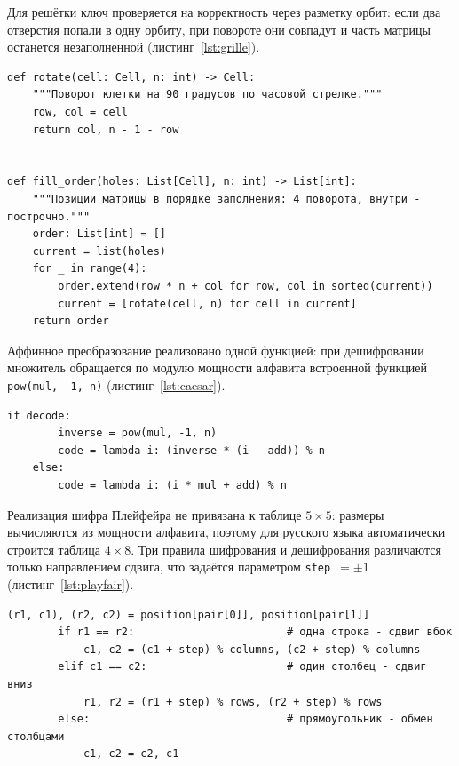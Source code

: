 \documentclass[14pt,a4paper]{extarticle}
\begin{document}
Для решётки ключ проверяется на корректность через разметку орбит: если два отверстия
попали в одну орбиту, при повороте они совпадут и часть матрицы останется незаполненной
(листинг~\ref{lst:grille}).

\begin{lstlisting}[style=python, caption={Разметка орбит поворота и порядок заполнения}, label={lst:grille}]
def rotate(cell: Cell, n: int) -> Cell:
    """Поворот клетки на 90 градусов по часовой стрелке."""
    row, col = cell
    return col, n - 1 - row


def fill_order(holes: List[Cell], n: int) -> List[int]:
    """Позиции матрицы в порядке заполнения: 4 поворота, внутри - построчно."""
    order: List[int] = []
    current = list(holes)
    for _ in range(4):
        order.extend(row * n + col for row, col in sorted(current))
        current = [rotate(cell, n) for cell in current]
    return order
\end{lstlisting}

Аффинное преобразование реализовано одной функцией: при дешифровании множитель
обращается по модулю мощности алфавита встроенной функцией \texttt{pow(mul, -1, n)}
(листинг~\ref{lst:caesar}).

\begin{lstlisting}[style=python, caption={Шифр Цезаря как частный случай аффинного преобразования}, label={lst:caesar}]
    if decode:
        inverse = pow(mul, -1, n)
        code = lambda i: (inverse * (i - add)) % n
    else:
        code = lambda i: (i * mul + add) % n
\end{lstlisting}

Реализация шифра Плейфейра не привязана к таблице $5 \times 5$: размеры вычисляются
из мощности алфавита, поэтому для русского языка автоматически строится таблица
$4 \times 8$. Три правила шифрования и дешифрования различаются только направлением
сдвига, что задаётся параметром \texttt{step}~$= \pm 1$ (листинг~\ref{lst:playfair}).

\begin{lstlisting}[style=python, caption={Правила шифра Плейфейра}, label={lst:playfair}]
        (r1, c1), (r2, c2) = position[pair[0]], position[pair[1]]
        if r1 == r2:                        # одна строка - сдвиг вбок
            c1, c2 = (c1 + step) % columns, (c2 + step) % columns
        elif c1 == c2:                      # один столбец - сдвиг вниз
            r1, r2 = (r1 + step) % rows, (r2 + step) % rows
        else:                               # прямоугольник - обмен столбцами
            c1, c2 = c2, c1
\end{lstlisting}
\end{document}
